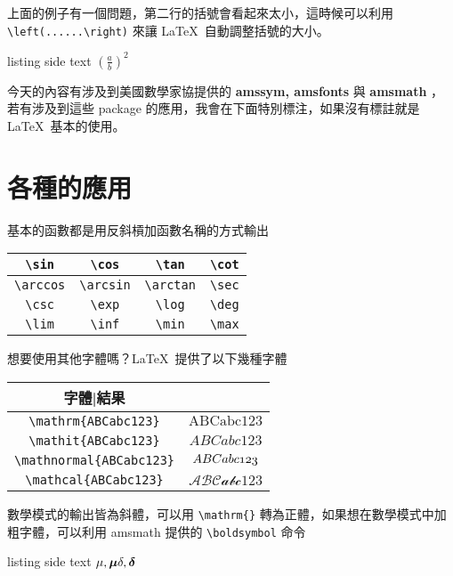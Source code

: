 上面的例子有一個問題，第二行的括號會看起來太小，這時候可以利用 \verb`\left(......\right)` 來讓 \LaTeX\ 自動調整括號的大小。

\begin{tcblisting}{listing side text}
$\left(\frac{a}{b}\right)^2$
\end{tcblisting}

今天的內容有涉及到美國數學家協提供的 \textbf{amssym, amsfonts} 與 \textbf{amsmath} ，若有涉及到這些 package 的應用，我會在下面特別標注，如果沒有標註就是\LaTeX\ 基本的使用。

\section{各種的應用}

基本的函數都是用反斜槓加函數名稱的方式輸出

\begin{tabular}{cccc}
\hline
\verb`\sin` & \verb`\cos` & \verb`\tan` & \verb`\cot` \\\hline
\verb`\arccos`  & \verb`\arcsin` & \verb`\arctan` & \verb`\sec` \\\hline
\verb`\csc`  & \verb`\exp` & \verb`\log` & \verb`\deg` \\\hline
\verb`\lim` & \verb`\inf`  & \verb`\min` & \verb`\max` \\\hline
\end{tabular}

想要使用其他字體嗎？\LaTeX\ 提供了以下幾種字體

\begin{tabular}{cc}
\hline
字體|結果 \\\hline\hline
\verb`\mathrm{ABCabc123}` & $\mathrm{ABCabc123}$ \\\hline
\verb`\mathit{ABCabc123}` & $\mathit{ABCabc123}$ \\\hline
\verb`\mathnormal{ABCabc123}` & $\mathnormal{ABCabc123}$ \\\hline
\verb`\mathcal{ABCabc123}` & $\mathcal{ABCabc123}$ \\\hline
\end{tabular}

數學模式的輸出皆為斜體，可以用 \verb`\mathrm{}` 轉為正體，如果想在數學模式中加粗字體，可以利用 amsmath 提供的 \verb`\boldsymbol` 命令

\begin{tcblisting}{listing side text}
$
\mu ,\boldsymbol{\mu}\\
\delta ,\boldsymbol{\delta}
$
\end{tcblisting}

